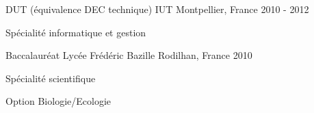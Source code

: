 \begin{cventries}
  \cventry
    {DUT (équivalence DEC technique)} %
    {IUT} %
    {Montpellier, France} %
    {2010 - 2012} %
    {
      \begin{cvitems} %
        \item {Spécialité informatique et gestion}
      \end{cvitems}
    }

  \cventry
    {Baccalauréat} %
    {Lycée Frédéric Bazille} %
    {Rodilhan, France} %
    {2010} %
    {
      \begin{cvitems} %
        \item {Spécialité scientifique}
        \item {Option Biologie/Ecologie}
      \end{cvitems}
    }

\end{cventries}
